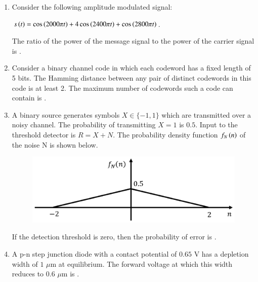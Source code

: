\documentclass[a4paper, 11pt]{article}
\begin{document}
\begin{enumerate}
    \hfill{}

    \item Consider the following amplitude modulated signal: 
    \begin{center}
    $s\left(t\right) = \cos\left(2000\pi t\right) + 4\cos\left(2400\pi t\right) + \cos\left(2800\pi t\right)$. 
    \end{center}
    The ratio  of the power of the message signal to the power of the carrier signal is \underline{\hspace{2cm}}.

    \hfill{}
    
    \item Consider a binary channel code in which each codeword has a fixed length of 5 bits. The Hamming distance between any pair of distinct codewords in this code is at least 2. The maximum number of codewords such a code can contain is \underline{\hspace{2cm}}.

    \hfill{}

    \item A binary source generates symbols $X \in \{-1, 1\}$ which are transmitted over a noisy channel. The probability of transmitting $X=1$ is $0.5$. Input to the threshold detector is $R = X + N$. The probability density function $f_N\left(n\right)$ of the noise N is shown below.
    \begin{figure}[H]
        \centering
        \includegraphics[width=0.5\columnwidth]{figs/q17.png}
        \caption*{}
        \label{fig:q17}
    \end{figure}
    If the detection threshold is zero, then the probability of error  is \underline{\hspace{2cm}}.

    \hfill{}
    
    \item A p-n step junction diode with a contact potential of $0.65$ V has a depletion width of $1$ $\mu$m at equilibrium. The forward voltage  at which this width reduces to $0.6$ $\mu$m is \underline{\hspace{2cm}}.


\end{enumerate}
\end{document}
